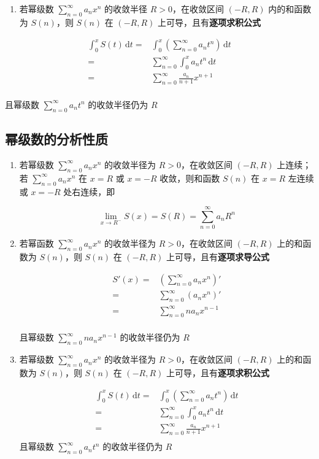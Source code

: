 \documentclass[lang = zh , final , oneside , openany , titlepage , zihao = -4 , linespread = 1.3 , baselineskip = false , cjk-font = windows , text-font = newtx , math-font = newtx , math-style = TeX]{sjtureport}
\begin{document}
\begin{enumerate}
\item
  若幂级数 \(\displaystyle \sum_{n=0}^\infty a_nx^n\) 的收敛半径
  \(R>0\)，在收敛区间 \((-R,R)\) 内的和函数为 \(S(n)\)，则 \(S(n)\) 在
  \((-R,R)\) 上可导，且有\textbf{逐项求积公式}
\end{enumerate}

\[\begin{aligned}
  \int_0^xS(t)\,\mathrm{d}t = &\int_0^x\left(\sum_{n=0}^\infty a_nt^n\right)\,\mathrm{d}t\\
    = &\sum_{n=0}^\infty \int_0^x a_nt^n\,\mathrm{d}t\\
    = &\sum_{n=0}^\infty \frac{a_n}{n+1}x^{n+1}\\
  \end{aligned}\]

且幂级数 \(\displaystyle \sum_{n=0}^\infty a_nt^n\) 的收敛半径仍为 \(R\)

\subsection{幂级数的分析性质}

\begin{enumerate}
    \item 若幂级数 \(\displaystyle \sum_{n=0}^\infty a_nx^n\) 的收敛半径为
\(R>0\)，在收敛区间 \((-R,R)\) 上连续；若
\(\displaystyle\sum_{n=0}^\infty a_nx^n\) 在 \(x=R\) 或 \(x=-R\)
收敛，则和函数 \(S(n)\) 在 \(x=R\) 左连续或 \(x=-R\) 处右连续，即

\[\displaystyle \lim_{x\to R^-}S(x)=S(R)=\sum_{n=0}^\infty a_nR^n\]

    \item 若幂函数 \(\displaystyle \sum_{n=0}^\infty a_nx^n\) 的收敛半径为
\(R>0\)，在收敛区间 \((-R,R)\) 上的和函数为 \(S(n)\)，则 \(S(n)\) 在
\((-R,R)\) 上可导，且有\textbf{逐项求导公式}

\[\begin{aligned}
S'(x) = &\left(\sum_{n=0}^\infty a_nx^n\right)'\\
  = &\sum_{n=0}^\infty \left(a_nx^n\right)'\\
  = &\sum_{n=0}^\infty na_nx^{n-1}\\
\end{aligned}\]

且幂级数 \(\displaystyle \sum_{n=0}^\infty na_nx^{n-1}\) 的收敛半径仍为
\(R\)

    \item 若幂级数 \(\displaystyle \sum_{n=0}^\infty a_nx^n\) 的收敛半径为
\(R>0\)，在收敛区间 \((-R,R)\) 上的和函数为 \(S(n)\)，则 \(S(n)\) 在
\((-R,R)\) 上可导，且有\textbf{逐项求积公式}

\[\begin{aligned}
\int_0^xS(t)\,\mathrm{d}t = &\int_0^x\left(\sum_{n=0}^\infty a_nt^n\right)\,\mathrm{d}t\\
  = &\sum_{n=0}^\infty \int_0^x a_nt^n\,\mathrm{d}t\\
  = &\sum_{n=0}^\infty \frac{a_n}{n+1}x^{n+1}\\
\end{aligned}
\]
且幂级数 \(\displaystyle \sum_{n=0}^\infty a_nt^n\) 的收敛半径仍为 \(R\)
\end{enumerate}
\end{document}
